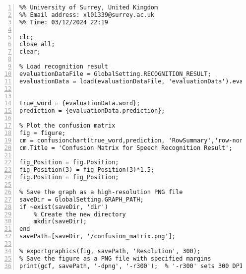 \documentclass{article}
\begin{document}
\begin{lstlisting}[frame=single, numbers=left, style=Matlab-editor, caption={compute\_confusion\_matrix.m}, label={lst:compute_confusion_matrix}]
  %% Author: Xiaoguang Liang (PG/T - Comp Sci & Elec Eng)
%% University of Surrey, United Kingdom
%% Email address: xl01339@surrey.ac.uk
%% Time: 03/12/2024 22:19

clc;
close all;
clear;

% Load recognition result
evaluationDataFile = GlobalSetting.RECOGNITION_RESULT;
evaluationData = load(evaluationDataFile, 'evaluationData').evaluationData;


true_word = {evaluationData.word};
prediction = {evaluationData.prediction};

% Plot the confusion matrix
fig = figure;
cm = confusionchart(true_word,prediction, 'RowSummary','row-normalized','ColumnSummary','column-normalized');
cm.Title = 'Confusion Matrix for Speech Recognition Result';

fig_Position = fig.Position;
fig_Position(3) = fig_Position(3)*1.5;
fig.Position = fig_Position;

% Save the graph as a high-resolution PNG file
saveDir = GlobalSetting.GRAPH_PATH;
if ~exist(saveDir, 'dir')
    % Create the new directory
    mkdir(saveDir);
end
savePath=[saveDir, '/confusion_matrix.png'];

% exportgraphics(fig, savePath, 'Resolution', 300);
% Save the figure as a PNG file with specified margins
print(gcf, savePath, '-dpng', '-r300');  % '-r300' sets 300 DPI for high resolution

\end{lstlisting}
\end{document}
